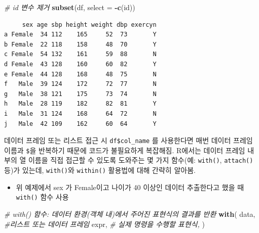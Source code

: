\documentclass[
  11pt,
]{krantz}
\makeatletter
\newenvironment{Shaded}{\begin{snugshade}}{\end{snugshade}}
\newcommand{\CommentTok}[1]{\textcolor[rgb]{0.37,0.37,0.37}{\textit{#1}}}
\newcommand{\DataTypeTok}[1]{\textcolor[rgb]{0.27,0.27,0.27}{#1}}
\newcommand{\KeywordTok}[1]{\textcolor[rgb]{0.27,0.27,0.27}{\textbf{#1}}}
\newcommand{\NormalTok}[1]{#1}
\newcommand{\OperatorTok}[1]{\textcolor[rgb]{0.43,0.43,0.43}{\textbf{#1}}}
\providecommand{\tightlist}{%
  \setlength{\itemsep}{0pt}\setlength{\parskip}{0pt}}
\newenvironment{kframe}{%
\medskip{}
\setlength{\fboxsep}{.8em}
 \def\at@end@of@kframe{}%
 \ifinner\ifhmode%
  \def\at@end@of@kframe{\end{minipage}}%
  \begin{minipage}{\columnwidth}%
 \fi\fi%
 \def\FrameCommand##1{\hskip\@totalleftmargin \hskip-\fboxsep
 \colorbox{shadecolor}{##1}\hskip-\fboxsep
     \hskip-\linewidth \hskip-\@totalleftmargin \hskip\columnwidth}%
 \MakeFramed {\advance\hsize-\width
   \@totalleftmargin\z@ \linewidth\hsize
   \@setminipage}}%
 {\par\unskip\endMakeFramed%
 \at@end@of@kframe}
\newenvironment{rmdblock}[1]
  {
  \begin{itemize}
  \renewcommand{\labelitemi}{
    \raisebox{-.7\height}[0pt][0pt]{
      {\setkeys{Gin}{width=3em,keepaspectratio}\texttt{[image: images/\#1]}}
    }
  }
  \setlength{\fboxsep}{1em}
  \begin{kframe}
  \item
  }
  {
  \end{kframe}
  \end{itemize}
  }
\newenvironment{rmdnote}
  {\begin{rmdblock}{note}}
  {\end{rmdblock}}
\makeatother
\begin{document}
\begin{Shaded}
\begin{Highlighting}[]
\CommentTok{# id 변수 제거}
\KeywordTok{subset}\NormalTok{(df, }\DataTypeTok{select =} \OperatorTok{-}\KeywordTok{c}\NormalTok{(id))}
\end{Highlighting}
\end{Shaded}

\begin{verbatim}
     sex age sbp height weight dbp exercyn
a Female  34 112    165     52  73       Y
b Female  22 118    158     48  70       Y
c Female  54 132    161     59  88       N
d Female  43 128    160     60  82       Y
e Female  44 128    168     48  75       N
f   Male  39 124    172     72  77       N
g   Male  38 121    175     73  74       N
h   Male  28 119    182     82  81       Y
i   Male  31 124    168     64  72       N
j   Male  42 109    162     60  64       Y
\end{verbatim}

\normalsize

\footnotesize

\begin{rmdnote}
\begin{rmdnote}

데이터 프레임 또는 리스트 접근 시 \texttt{df\$col\_name} 를 사용한다면 매번 데이터 프레임 이름과 \texttt{\$}을 반복하기 때문에 코드가 불필요하게 복잡해짐. R에서는 데이터 프레임 내부의 열 이름을 직접 접근할 수 있도록 도와주는 몇 가지 함수(예: \texttt{with()}, \texttt{attach()} 등)가 있는데, \texttt{with()}와 \texttt{within()} 활용법에 대해 간략히 알아봄.

\end{rmdnote}
\end{rmdnote}

\normalsize

\begin{itemize}
\tightlist
\item
  위 예제에서 sex 가 Female이고 나이가 40 이상인 데이터 추출한다고 했을 때 \texttt{with()} 함수 사용
\end{itemize}

\footnotesize

\begin{Shaded}
\begin{Highlighting}[]
\CommentTok{# with() 함수: 데이터 환경(객체 내)에서 주어진 표현식의 결과를 반환}
\KeywordTok{with}\NormalTok{(}
\NormalTok{  data, }\CommentTok{#리스트 또는 데이터 프레임}
\NormalTok{  expr, }\CommentTok{# 실제 명령을 수행할 표현식, }
\NormalTok{)}
\end{Highlighting}
\end{Shaded}
\end{document}
